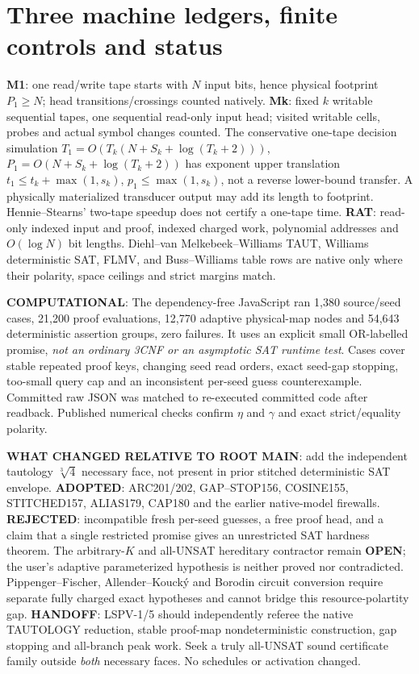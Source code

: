 \documentclass[11pt]{article}
\begin{document}
\section{Three machine ledgers, finite controls and status}
\textbf{M1}: one read/write tape starts with $N$ input bits, hence physical footprint $P_1\ge N$; head transitions/crossings counted natively.
\textbf{Mk}: fixed $k$ writable sequential tapes, one sequential read-only input head; visited writable cells, probes and actual symbol changes counted. The conservative one-tape decision simulation $T_1=O(T_k(N+S_k+\log(T_k+2)))$, $P_1=O(N+S_k+\log(T_k+2))$ has exponent upper translation $t_1\le t_k+\max(1,s_k)$, $p_1\le\max(1,s_k)$, not a reverse lower-bound transfer. A physically materialized transducer output may add its length to footprint. Hennie--Stearns' two-tape speedup does not certify a one-tape time.
\textbf{RAT}: read-only indexed input and proof, indexed charged work, polynomial addresses and $O(\log N)$ bit lengths. Diehl--van Melkebeek--Williams TAUT, Williams deterministic SAT, FLMV, and Buss--Williams table rows are native only where their polarity, space ceilings and strict margins match.

\textbf{COMPUTATIONAL}: The dependency-free JavaScript
ran 1,380 source/seed cases, 21,200 proof evaluations, 12,770 adaptive physical-map nodes and 54,643 deterministic assertion groups, zero failures. It uses an explicit small OR-labelled promise, \emph{not an ordinary 3CNF or an asymptotic SAT runtime test}. Cases cover stable repeated proof keys, changing seed read orders, exact seed-gap stopping, too-small query cap and an inconsistent per-seed guess counterexample. Committed raw JSON was matched to re-executed committed code after readback. Published numerical checks confirm $\eta$ and $\gamma$ and exact strict/equality polarity.

\textbf{WHAT CHANGED RELATIVE TO ROOT MAIN}: add the independent tautology $\sqrt[3]{4}$ necessary face, not present in prior stitched deterministic SAT envelope. \textbf{ADOPTED}: ARC201/202, GAP--STOP156, COSINE155, STITCHED157, ALIAS179, CAP180 and the earlier native-model firewalls. \textbf{REJECTED}: incompatible fresh per-seed guesses, a free proof head, and a claim that a single restricted promise gives an unrestricted SAT hardness theorem. The arbitrary-$K$ and all-UNSAT hereditary contractor remain \textbf{OPEN}; the user's adaptive parameterized hypothesis is neither proved nor contradicted. Pippenger--Fischer, Allender--Kouck\'y and Borodin circuit conversion require separate fully charged exact hypotheses and cannot bridge this resource-polartity gap.
\textbf{HANDOFF}: LSPV-1/5 should independently referee the native TAUTOLOGY reduction, stable proof-map nondeterministic construction, gap stopping and all-branch peak work. Seek a truly all-UNSAT sound certificate family outside \emph{both} necessary faces. No schedules or activation changed.
\end{document}
